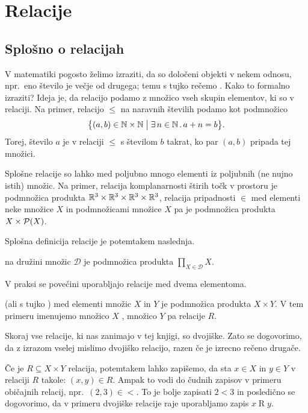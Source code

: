 \chapter{Relacije}\label{POGLAVJE: Relacije}

	\section{Splošno o relacijah}
	
		V matematiki pogosto želimo izraziti, da so določeni objekti v nekem odnosu, npr.~eno število je večje od drugega; temu s tujko rečemo . Kako to formalno izraziti? Ideja je, da relacijo podamo z množico vseh skupin elementov, ki so v relaciji. Na primer, relacijo $\leq$ na naravnih številih podamo kot podmnožico
		\[\set[1]{(a, b) \in \NN \times \NN}{\xsome{n}[\NN]{a + n = b}}.\]
		Torej, število $a$ je v relaciji $\leq$ s številom $b$ takrat, ko par $(a, b)$ pripada tej množici.
		
		Splošne relacije so lahko med poljubno mnogo elementi iz poljubnih (ne nujno istih) množic. Na primer, relacija komplanarnosti štirih točk v prostoru je podmnožica produkta $\mathbb{R}^3 \times \mathbb{R}^3 \times \mathbb{R}^3 \times \mathbb{R}^3$, relacija pripadnosti $\in$ med elementi neke množice $X$ in podmnožicami množice $X$ pa je podmnožica produkta $X \times \mathcal{P}(X)$.
		
		Splošna definicija relacije je potemtakem naslednja.
		\begin{definicija}
			 na družini množic $\mathscr{D}$ je podmnožica produkta $\prod_{X \in \mathscr{D}} X$.
		\end{definicija}
		
		V praksi se povečini uporabljajo relacije med dvema elementoma.
		\begin{definicija}
			 (ali s tujko )  med elementi množic $X$ in $Y$ je podmnožica produkta $X \times Y$. V tem primeru imenujemo množico $X$ , množico $Y$ pa  relacije $R$.
		\end{definicija}
		
		Skoraj vse relacije, ki nas zanimajo v tej knjigi, so dvojiške. Zato se dogovorimo, da z izrazom  vselej mislimo dvojiško relacijo, razen če je izrecno rečeno drugače.
		
		Če je $R \subseteq X \times Y$ relacija, potemtakem lahko zapišemo, da sta $x \in X$ in $y \in Y$ v relaciji $R$ takole: $(x, y) \in R$. Ampak to vodi do čudnih zapisov v primeru običajnih relacij, npr.~$(2, 3) \in <$. To je bolje zapisati $2 < 3$ in posledično se dogovorimo, da v primeru dvojiške relacije raje uporabljamo zapis $x \mathrel{R} y$.
		
